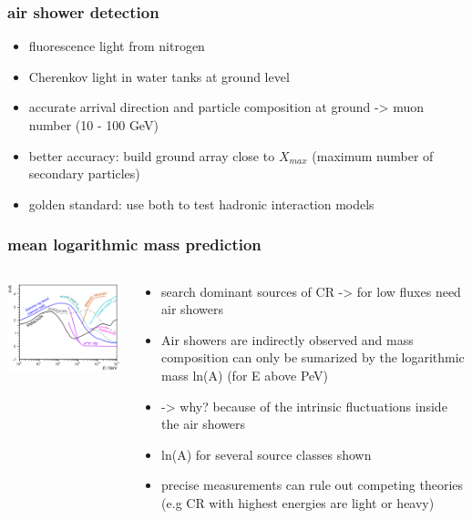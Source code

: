 \documentclass[aspectratio=1610, 9pt]{beamer}
\begin{document}
\begin{frame}\frametitle{air shower detection}
  \begin{itemize}
    \item fluorescence light from nitrogen
    \item Cherenkov light in water tanks at ground level
    \item accurate arrival direction and particle composition at ground -> muon number (10 - 100 GeV)
    \item better accuracy: build ground array close to $X_{max}$ (maximum number of secondary particles)
    \item golden standard: use both to test hadronic interaction models
  \end{itemize}
\end{frame}

\begin{frame}\frametitle{mean logarithmic mass prediction}
  \begin{columns}
    \begin{column}[c]{0.48\textwidth}
      \includegraphics{lnA_left.png}
    \end{column}
    \begin{column}[c]{0.48\textwidth}
      \begin{itemize}
        \item search dominant sources of CR -> for low fluxes need air showers
        \item Air showers are indirectly observed and mass composition can only be sumarized by the logarithmic mass ln(A) (for E above PeV)
        \item -> why? because of the intrinsic fluctuations inside the air showers
        \item ln(A) for several source classes shown
        \item precise measurements can rule out competing theories (e.g CR with highest energies are light or heavy)
      \end{itemize}
    \end{column}
  \end{columns}
\end{frame}
\end{document}
